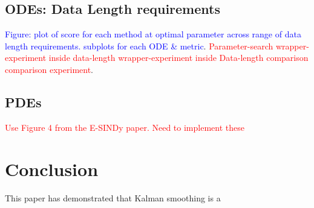 \documentclass{article}
\begin{document}
\subsection{ODEs: Data Length requirements}
\textcolor{blue}{Figure: plot of score for each method at optimal parameter across range of data length requirements.  subplots for each ODE \& metric}.  \textcolor{red}{Parameter-search wrapper-experiment inside data-length wrapper-experiment inside Data-length comparison comparison experiment}.
\subsection{PDEs}
\textcolor{red}{Use Figure 4 from the E-SINDy paper. Need to implement these}
\section{Conclusion}
This paper has demonstrated that Kalman smoothing is a 
\end{document}
